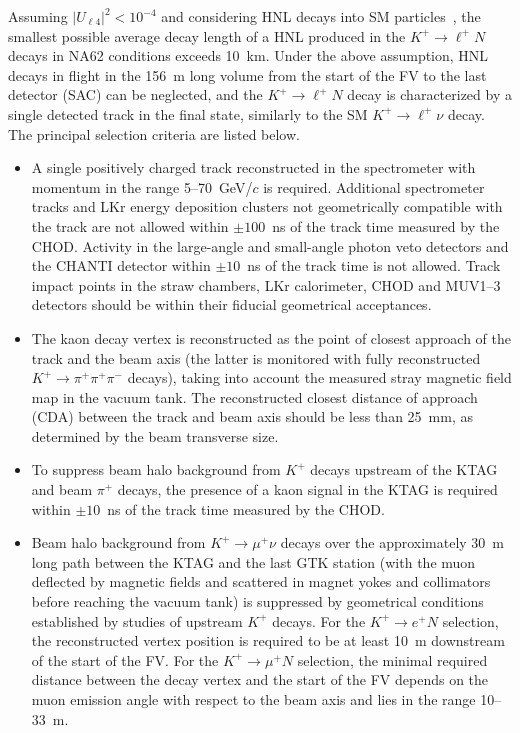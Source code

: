 \documentclass[11pt]{article}
\begin{document}
Assuming $|U_{\ell4}|^2<10^{-4}$ and considering HNL decays into SM particles~\cite{go07}, the smallest possible average decay length of a HNL produced in the $K^+\to\ell^+N$ decays in NA62 conditions exceeds 10~km. Under the above assumption, HNL decays in flight in the 156~m long volume from the start of the FV to the last detector (SAC) can be neglected, and the $K^+\to\ell^+N$ decay is characterized by a single detected track in the final state, similarly to the SM $K^+\to\ell^+\nu$ decay. The principal selection criteria are listed below.
%
%
\begin{itemize}
%
\item A single positively charged track reconstructed in the spectrometer with momentum in the range 5--70~GeV/$c$ is required. Additional spectrometer tracks and LKr energy deposition clusters not geometrically compatible with the track are not allowed within $\pm 100$~ns of the track time measured by the CHOD. Activity in the large-angle and small-angle photon veto detectors and the CHANTI detector within $\pm 10$~ns of the track time is not allowed. Track impact points in the straw chambers, LKr calorimeter, CHOD and MUV1--3 detectors should be within their fiducial geometrical acceptances.
%
\item The kaon decay vertex is reconstructed as the point of closest approach of the track and the beam axis (the latter is monitored with fully reconstructed $K^+\to\pi^+\pi^+\pi^-$ decays), taking into account the measured stray magnetic field map in the vacuum tank. The reconstructed closest distance of approach (CDA) between the track and beam axis should be less than 25~mm, as determined by the beam transverse size.
%
\item To suppress beam halo background from $K^+$ decays upstream of the KTAG and beam $\pi^+$ decays, the presence of a kaon signal in the KTAG is required within $\pm 10$~ns of the track time measured by the CHOD.
%
\item Beam halo background from $K^+\to\mu^+\nu$ decays over the approximately 30~m long path between the KTAG and the last GTK station (with the muon deflected by  magnetic fields and scattered in magnet yokes and collimators before reaching the vacuum tank) is suppressed by geometrical conditions established by studies of upstream $K^+$ decays. For the $K^+\to e^+N$ selection, the reconstructed vertex position is required to be at least 10~m downstream of the start of the FV. For the $K^+\to\mu^+N$ selection, the minimal required distance between the decay vertex and the start of the FV depends on the muon emission angle with respect to the beam axis and lies in the range 10--33~m.

\end{itemize}
\end{document}
